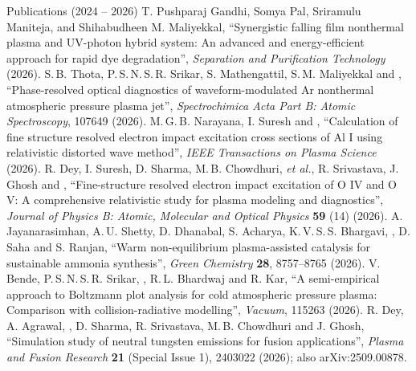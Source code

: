 \begin{rubric}{Publications (2024 -- 2026)}
\entry*[] \small T. Pushparaj Gandhi, Somya Pal, Sriramulu Maniteja,  and Shihabudheen M. Maliyekkal,
  ``Synergistic falling film nonthermal plasma and UV-photon hybrid system: An advanced and energy-efficient approach for rapid dye degradation'',
  \emph{Separation and Purification Technology} (2026). 
\entry*[] \small S.\,B. Thota, P.\,S.\,N.\,S.\,R. Srikar, S. Mathengattil, S.\,M. Maliyekkal and ,
  ``Phase-resolved optical diagnostics of waveform-modulated Ar nonthermal atmospheric pressure plasma jet'',
  \emph{Spectrochimica Acta Part B: Atomic Spectroscopy}, 107649 (2026). 
\entry*[] \small M.\,G.\,B. Narayana, I. Suresh and ,
  ``Calculation of fine structure resolved electron impact excitation cross sections of Al I using relativistic distorted wave method'',
  \emph{IEEE Transactions on Plasma Science} (2026). 
\entry*[] \small R. Dey, I. Suresh, D. Sharma, M.\,B. Chowdhuri, \emph{et al.}, R. Srivastava, J. Ghosh and ,
  ``Fine-structure resolved electron impact excitation of O IV and O V: A comprehensive relativistic study for plasma modeling and diagnostics'',
  \emph{Journal of Physics B: Atomic, Molecular and Optical Physics} \textbf{59} (14) (2026). 
\entry*[] \small A. Jayanarasimhan, A.\,U. Shetty, D. Dhanabal, S. Acharya, K.\,V.\,S.\,S. Bhargavi, , D. Saha and S. Ranjan,
  ``Warm non-equilibrium plasma-assisted catalysis for sustainable ammonia synthesis'',
  \emph{Green Chemistry} \textbf{28}, 8757--8765 (2026). 
\entry*[] \small V. Bende, P.\,S.\,N.\,S.\,R. Srikar, , R.\,L. Bhardwaj and R. Kar,
  ``A semi-empirical approach to Boltzmann plot analysis for cold atmospheric pressure plasma: Comparison with collision-radiative modelling'',
  \emph{Vacuum}, 115263 (2026). 
\entry*[] \small R. Dey, A. Agrawal, , D. Sharma, R. Srivastava, M.\,B. Chowdhuri and J. Ghosh,
  ``Simulation study of neutral tungsten emissions for fusion applications'',
  \emph{Plasma and Fusion Research} \textbf{21} (Special Issue 1), 2403022 (2026); also arXiv:2509.00878. 


\end{rubric}
